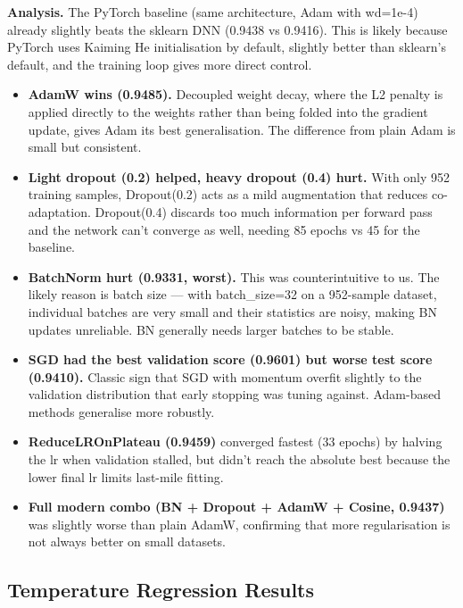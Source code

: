 \documentclass[11pt,a4paper]{article}
\begin{document}
\textbf{Analysis.}
The PyTorch baseline (same architecture, Adam with wd=1e-4) already slightly beats the sklearn DNN (0.9438 vs 0.9416).
This is likely because PyTorch uses Kaiming He initialisation by default, slightly better than sklearn's default, and the training loop gives more direct control.

\begin{itemize}[leftmargin=1.2em,itemsep=0.15em]
    \item \textbf{AdamW wins (0.9485).} Decoupled weight decay, where the L2 penalty is applied directly to the weights rather than being folded into the gradient update, gives Adam its best generalisation. The difference from plain Adam is small but consistent.
    \item \textbf{Light dropout (0.2) helped, heavy dropout (0.4) hurt.} With only 952 training samples, Dropout(0.2) acts as a mild augmentation that reduces co-adaptation. Dropout(0.4) discards too much information per forward pass and the network can't converge as well, needing 85 epochs vs 45 for the baseline.
    \item \textbf{BatchNorm hurt (0.9331, worst).} This was counterintuitive to us. The likely reason is batch size --- with batch\_size=32 on a 952-sample dataset, individual batches are very small and their statistics are noisy, making BN updates unreliable. BN generally needs larger batches to be stable.
    \item \textbf{SGD had the best validation score (0.9601) but worse test score (0.9410).} Classic sign that SGD with momentum overfit slightly to the validation distribution that early stopping was tuning against. Adam-based methods generalise more robustly.
    \item \textbf{ReduceLROnPlateau (0.9459)} converged fastest (33 epochs) by halving the lr when validation stalled, but didn't reach the absolute best because the lower final lr limits last-mile fitting.
    \item \textbf{Full modern combo (BN + Dropout + AdamW + Cosine, 0.9437)} was slightly worse than plain AdamW, confirming that more regularisation is not always better on small datasets.
\end{itemize}

\subsection{Temperature Regression Results}
\end{document}
